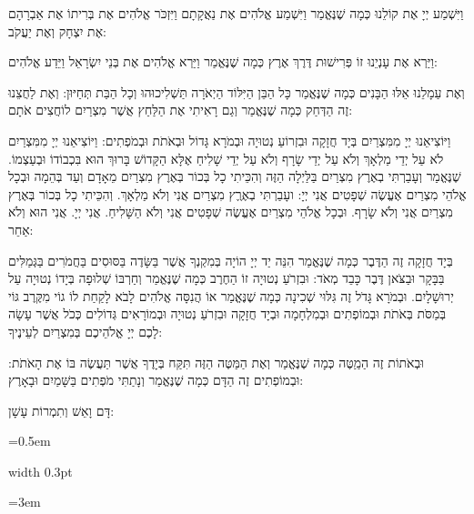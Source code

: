 \documentclass[11pt, openany]{book}
\newlength{\bidiHebWidth}
\newlength{\bidiEngWidth}
\newenvironment{bilingual}{%
  \par\vspace{4pt}%
}{%
  \noindent
  \begin{minipage}[t]{\bidiEngWidth}
    \setstretch{1.4}\emergencystretch=0.5em\normalsize
    \usebox{\bidiEngBox}
  \end{minipage}%
  \hfill
  {\color{sedergold}\vrule width 0.3pt}%
  \hfill
  \begin{minipage}[t]{\bidiHebWidth}
    \begingroup\hebrewfont\TeXXeTstate=1\beginR
    \large\setstretch{1.4}\emergencystretch=3em\tolerance=9999\parindent=0pt\relax
    \usebox{\bidiHebBox}
    \endR\endgroup
  \end{minipage}%
  \par\vspace{2pt}%
}
\newenvironment{hebrewcol}{%
  \begin{lrbox}{\bidiHebBox}\begin{minipage}{\bidiHebWidth}%
}{%
  \end{minipage}\end{lrbox}%
}
\begin{document}
\begin{bilingual}
\begin{hebrewcol}
וַיִּשְׁמַע יְיָ אֶת קוֹלֵנוּ כְּמָה שֶׁנֶּאֱמַר וַיִּשְׁמַע אֱלֹהִים אֶת נַאֲקָתָם וַיִּזְכֹּר אֱלֹהִים אֶת בְּרִיתוֹ אֶת אַבְרָהָם אֶת יִצְחָק וְאֶת יַעֲקֹב:

וַיַּרְא אֶת עָנְיֵנוּ זוֹ פְּרִישׁוּת דֶּרֶךְ אֶרֶץ כְּמָה שֶׁנֶּאֱמַר וַיַּרְא אֱלֹהִים אֶת בְּנֵי יִשְׂרָאֵל וַיֵּדַע אֱלֹהִים:

וְאֶת עַמָלֵנוּ אֵלּוּ הַבָּנִים כְּמָה שֶׁנֶּאֱמַר כָּל הַבֵּן הַיִּלּוֹד הַיְאֹרָה תַּשְׁלִיכוּהוּ וְכָל הַבַּת תְּחַיּוּן: וְאֶת לַחֲצֵנוּ זֶה הַדְּחַק כְּמָה שֶׁנֶּאֱמַר וְגַם רָאִיתִי אֶת הַלַּחַץ אֲשֶׁר מִצְרַיִם לוֹחֲצִים אֹתָם:

וַיּוֹצִיאֵנוּ יְיָ מִמִּצְרַיִם בְּיָד חֲזָקָה וּבִזְרוֹעַ נְטוּיָה וּבְמֹרָא גָּדוֹל וּבְאֹתֹת וּבְמֹפְתִים: וַיּוֹצִיאֵנוּ יְיָ מִמִּצְרַיִם לֹא עַל יְדֵי מַלְאָךְ וְלֹא עַל יְדֵי שָׂרָף וְלֹא עַל יְדֵי שָׁלִיחַ אֶלָּא הַקָּדוֹשׁ בָּרוּךְ הוּא בִּכְבוֹדוֹ וּבְעַצְמוֹ. שֶׁנֶּאֱמַר וְעָבַרְתִּי בְאֶרֶץ מִצְרַיִם בַּלַּיְלָה הַזֶּה וְהִכֵּיתִי כָל בְּכוֹר בְּאֶרֶץ מִצְרַיִם מֵאָדָם וְעַד בְּהֵמָה וּבְכָל אֱלֹהֵי מִצְרַיִם אֶעֱשֶׂה שְׁפָטִים אֲנִי יְיָ: ועָבַרְתִּי בְאֶרֶֶץ מִצְרַיִם אֲנִי וְלֹא מַלְאָךְ. וְהִכֵּיתִי כָל בְּכוֹר בְּאֶרֶץ מִצְרַיִם אֲנִי וְלֹא שָׂרָף. וּבְכָל אֱלֹהֵי מִצְרַיִם אֶעֱשֶׂה שְׁפָטִים אֲנִי וְלֹא הַשָּׁלִיחַ. אֲנִי יְיָ. אֲנִי הוּא וְלֹא אַחֵר:

בְּיָד חֲזָקָה זֶה הַדֶּבֶר כְּמָה שֶׁנֶּאֱמַר הִנֵּה יַד יְיָ הוֹיָה בְּמִקְנְךָ אֲשֶׁר בַּשָּׂדֶה בַּסּוּסִים בַּחֲמֹרִים בַּגְּמַלִּים בַּבָּקָר וּבַצֹּאן דֶּבֶר כָּבֵד מְאֹד: וּבִזְרֹעַ נְטוּיָה זוֹ הַחֶרֶב כְּמָה שֶׁנֶּאֱמַר וְחַרְבּוֹ שְׁלוּפָה בְּיָדוֹ נְטוּיָה עַל יְרוּשָׁלָיִם. וּבְמֹרָא גָּדֹל זֶה גִּלּוּי שְׁכִינָה כְּמָה שֶׁנֶּאֱמַר אוֹ הֲנִסָּה אֱלֹהִים לָבֹא לָקַחַת לוֹ גוֹי מִקֶּרֶב גּוֹי בְּמַסֹּת בְּאֹתֹת וּבְמוֹפְתִים וּבְמִלְחָמָה וּבְיָד חֲזָקָה וּבִזְרֹעַ נְטוּיָה וּבְמוֹרָאִים גְּדוֹלִים כְּכֹל אֲשֶׁר עָשָׂה לָכֶם יְיָ אֱלֹהֵיכֶם בְּמִצְרַיִם לְעֵינֶיךָ:

וּבְאֹתוֹת זֶה הַמַַטֶּה כְּמָה שֶׁנֶּאֱמַר וְאֶת הַמַּטֶּה הַזֶּה תִּקַּח בְּיָדֶךָ אֲשֶׁר תַּעֲשֶׂה בּוֹ אֶת הָאֹתֹת: וּבְמוֹפְתִים זֶה הַדָּם כְּמָה שֶׁנֶּאֱמַר וְנָתַתִּי מֹפְתִים בַּשָּׁמַיִם וּבָאָרֶץ:

דָּם וָאֵשׁ וְתִמְרוֹת עָשָׁן:


\end{hebrewcol}
\end{bilingual}
\end{document}
